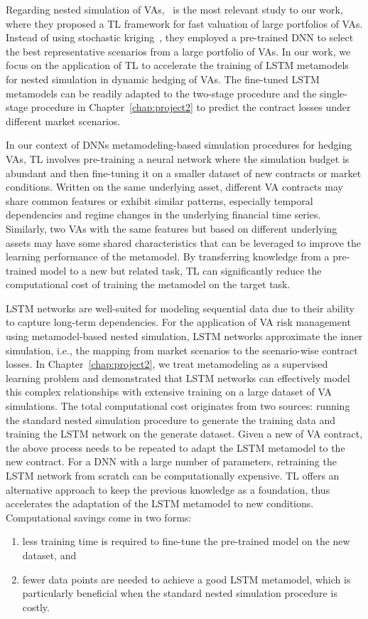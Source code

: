 Regarding nested simulation of VAs,~\cite{cheng2019fast} is the most relevant study to our work, where they proposed a TL framework for fast valuation of large portfolios of VAs.
Instead of using stochastic kriging~\citep{gan2015valuation}, they employed a pre-trained DNN to select the best representative scenarios from a large portfolio of VAs.
In our work, we focus on the application of TL to accelerate the training of LSTM metamodels for nested simulation in dynamic hedging of VAs.
The fine-tuned LSTM metamodels can be readily adapted to the two-stage procedure and the single-stage procedure in Chapter~\ref{chap:project2} to predict the contract losses under different market scenarios.

In our context of DNNs metamodeling-based simulation procedures for hedging VAs, TL involves pre-training a neural network where the simulation budget is abundant and then fine-tuning it on a smaller dataset of new contracts or market conditions.
Written on the same underlying asset, different VA contracts may share common features or exhibit similar patterns, especially temporal dependencies and regime changes in the underlying financial time series.
Similarly, two VAs with the same features but based on different underlying assets may have some shared characteristics that can be leveraged to improve the learning performance of the metamodel.
By transferring knowledge from a pre-trained model to a new but related task, TL can significantly reduce the computational cost of training the metamodel on the target task.

LSTM networks are well-suited for modeling sequential data due to their ability to capture long-term dependencies.
For the application of VA risk management using metamodel-based nested simulation, LSTM networks approximate the inner simulation, i.e., the mapping from market scenarios to the scenario-wise contract losses.
In Chapter~\ref{chap:project2}, we treat metamodeling as a supervised learning problem and demonstrated that LSTM networks can effectively model this complex relationships with extensive training on a large dataset of VA simulations.
The total computational cost originates from two sources: running the standard nested simulation procedure to generate the training data and training the LSTM network on the generate dataset.
Given a new of VA contract, the above process needs to be repeated to adapt the LSTM metamodel to the new contract.
For a DNN with a large number of parameters, retraining the LSTM network from scratch can be computationally expensive.
TL offers an alternative approach to keep the previous knowledge as a foundation, thus accelerates the adaptation of the LSTM metamodel to new conditions.
Computational savings come in two forms: 
\begin{enumerate}
    \item   less training time is required to fine-tune the pre-trained model on the new dataset, and
    \item   fewer data points are needed to achieve a good LSTM metamodel, which is particularly beneficial when the standard nested simulation procedure is costly.
\end{enumerate}

